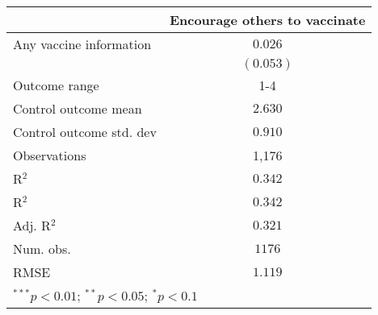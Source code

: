
\begin{table}
\begin{center}
\begin{tabular}{l c}
\hline
 & Encourage others to vaccinate \\
\hline
Any vaccine information  & $0.026$   \\
                         & $(0.053)$ \\
\hline
Outcome range            & 1-4       \\
Control outcome mean     & $2.630$   \\
Control outcome std. dev & $0.910$   \\
Observations             & 1,176     \\
R$^{2}$                  & $0.342$   \\
R$^2$                    & $0.342$   \\
Adj. R$^2$               & $0.321$   \\
Num. obs.                & $1176$    \\
RMSE                     & $1.119$   \\
\hline
\multicolumn{2}{l}{\scriptsize{$^{***}p<0.01$; $^{**}p<0.05$; $^{*}p<0.1$}}
\end{tabular}
\caption{}
\label{table:Tables and Figures/SI_table21_anyinfo_Peru_encourage1-4}
\end{center}
\end{table}
